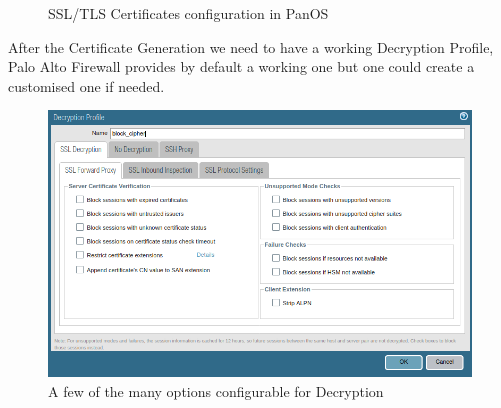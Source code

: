 \begin{figure}[!hb]
\centering
 \hspace{0.5cm}
 \caption{SSL/TLS Certificates configuration in PanOS}\label{Certificates}
\end{figure}

\newpage

After the Certificate Generation we need to have a working Decryption Profile, Palo Alto Firewall provides by default a working one but one could create a customised one if needed.

\begin{figure}[!hb]
    \centering
     \includegraphics[width=13cm]{img/decryption_options.png}
    	\caption{A few of the many options configurable for Decryption}\label{Decryption Options}
\end{figure}

